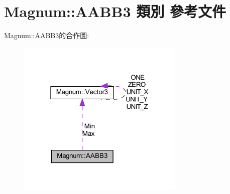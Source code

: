 \hypertarget{class_magnum_1_1_a_a_b_b3}{}\section{Magnum\+:\+:A\+A\+B\+B3 類別 參考文件}
\label{class_magnum_1_1_a_a_b_b3}


Magnum\+:\+:A\+A\+B\+B3的合作圖\+:\nopagebreak
\begin{figure}[H]
\begin{center}
\leavevmode
\includegraphics[width=226pt]{class_magnum_1_1_a_a_b_b3__coll__graph}
\end{center}
\end{figure}
